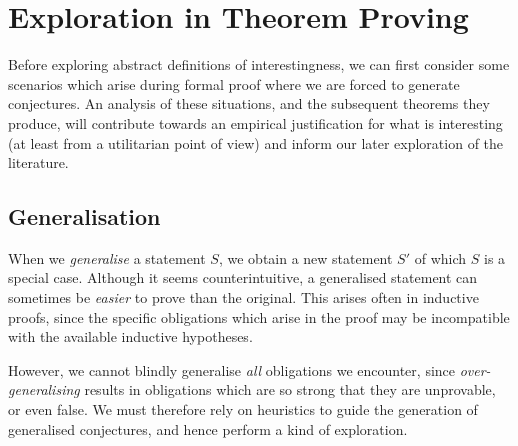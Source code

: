 \documentclass[]{article}
\begin{document}




\section{Exploration in Theorem Proving}
\label{examples}

Before exploring abstract definitions of interestingness, we can first consider some scenarios which arise during formal proof where we are forced to generate conjectures. An analysis of these situations, and the subsequent theorems they produce, will contribute towards an empirical justification for what is interesting (at least from a utilitarian point of view) and inform our later exploration of the literature.

\subsection{Generalisation}

\providecommand{\coq}[1]{\lstinline[language=ML]|#1|}

When we \emph{generalise} a statement $S$, we obtain a new statement $S'$ of which $S$ is a special case. Although it seems counterintuitive, a generalised statement can sometimes be \emph{easier} to prove than the original. This arises often in inductive proofs, since the specific obligations which arise in the proof may be incompatible with the available inductive hypotheses.

However, we cannot blindly generalise \emph{all} obligations we encounter, since \emph{over-generalising} results in obligations which are so strong that they are unprovable, or even false. We must therefore rely on heuristics to guide the generation of generalised conjectures, and hence perform a kind of exploration.
\end{document}
